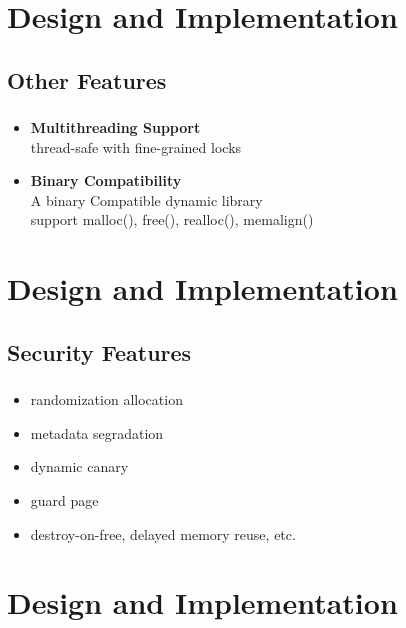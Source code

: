 \documentclass{beamer}
\begin{document}
\section{Design and Implementation}
\subsection{Other Features}
\begin{frame}
		\frametitle{\secname}
    \framesubtitle{\subsecname}
    \begin{itemize}
      \item \textbf{Multithreading Support}\\
          thread-safe with fine-grained locks
      \item \textbf{Binary Compatibility}\\
          A binary Compatible dynamic library \\
            support malloc(), free(), realloc(), memalign()
    \end{itemize}
\end{frame}

\section{Design and Implementation}
\subsection{Security Features}
\begin{frame}
    \frametitle{\secname}
    \framesubtitle{\subsecname}
    \begin{itemize}
        \item randomization allocation
        \item metadata segradation
        \item dynamic canary
        \item guard page
        \item destroy-on-free, delayed memory reuse, etc.
    \end{itemize}
\end{frame}

\section{Design and Implementation}
\end{document}
